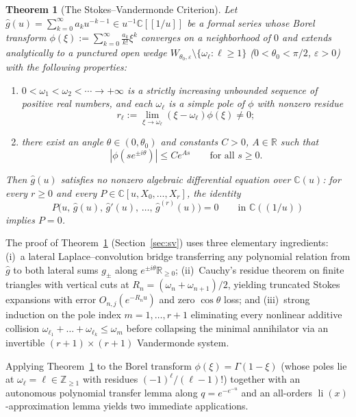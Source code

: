 \documentclass[10pt,reqno]{amsart}
\numberwithin{equation}{section}
\newtheorem{theorem}{Theorem}
\theoremstyle{definition}
\newcommand{\Z}{\mathbb{Z}}
\newcommand{\R}{\mathbb{R}}
\newcommand{\C}{\mathbb{C}}
\DeclareMathOperator{\li}{li}
\begin{document}
\begin{theorem}[The Stokes--Vandermonde Criterion]\label{thm:sv}
Let $\widehat{g}(u) = \sum_{k=0}^\infty a_k u^{-k-1} \in u^{-1}\C[[1/u]]$ be a formal series whose Borel transform $\phi(\xi) := \sum_{k=0}^\infty \frac{a_k}{k!} \xi^k$ converges on a neighborhood of $0$ and extends analytically to a punctured open wedge $W_{\theta_0,\varepsilon} \setminus \{\omega_\ell : \ell \ge 1\}$ ($0 < \theta_0 < \pi/2$, $\varepsilon > 0$) with the following properties:
\begin{enumerate}[(1)]
  \item $0 < \omega_1 < \omega_2 < \cdots \to +\infty$ is a strictly increasing unbounded sequence of positive real numbers, and each $\omega_\ell$ is a simple pole of $\phi$ with nonzero residue
  \[
    r_\ell := \lim_{\xi \to \omega_\ell} (\xi - \omega_\ell)\phi(\xi) \neq 0;
  \]
  \item there exist an angle $\theta \in (0, \theta_0)$ and constants $C > 0$, $A \in \R$ such that
  \[
    |\phi(s e^{\pm i\theta})| \le C e^{A s} \qquad \text{for all } s \ge 0.
  \]
\end{enumerate}
Then $\widehat{g}(u)$ satisfies no nonzero algebraic differential equation over $\C(u)$: for every $r \ge 0$ and every $P \in \C[u, X_0, \dots, X_r]$, the identity
\[
  P\bigl(u,\, \widehat{g}(u),\, \widehat{g}'(u),\, \dots,\, \widehat{g}^{(r)}(u)\bigr) = 0 \qquad \text{in } \C((1/u))
\]
implies $P = 0$.
\end{theorem}

The proof of Theorem~\ref{thm:sv} (Section~\ref{sec:sv}) uses three elementary ingredients: (i)~a lateral Laplace--convolution bridge transferring any polynomial relation from $\widehat{g}$ to both lateral sums $g_\pm$ along $e^{\pm i\theta}\R_{\ge 0}$; (ii)~Cauchy's residue theorem on finite triangles with vertical cuts at $R_n = (\omega_n + \omega_{n+1})/2$, yielding truncated Stokes expansions with error $O_{n,j}(e^{-R_n u})$ and zero $\cos\theta$ loss; and (iii)~strong induction on the pole index $m = 1, \dots, r+1$ eliminating every nonlinear additive collision $\omega_{\ell_1} + \dots + \omega_{\ell_k} \le \omega_m$ before collapsing the minimal annihilator via an invertible $(r+1)\times(r+1)$ Vandermonde system.

Applying Theorem~\ref{thm:sv} to the Borel transform $\phi(\xi) = \Gamma(1 - \xi)$ (whose poles lie at $\omega_\ell = \ell \in \Z_{\ge 1}$ with residues $(-1)^\ell / (\ell-1)!$) together with an autonomous polynomial transfer lemma along $q = e^{-e^{-u}}$ and an all-orders $\li(x)$-approximation lemma yields two immediate applications.
\end{document}
